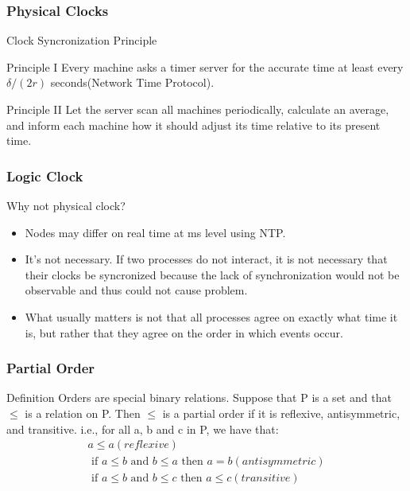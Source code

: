 \begin{frame}
    \frametitle{Physical Clocks}
    Clock Syncronization Principle
    \begin{block}{Principle I}
        Every machine asks a timer server for the accurate time at least every $\delta/(2r)$ seconds(Network Time Protocol).
    \end{block}
    \begin{block}{Principle II}
        Let the server scan all machines periodically, calculate an average, and inform each machine how it should adjust its time relative to its present time.
    \end{block}
\end{frame}

\begin{frame}
    \frametitle{Logic Clock}
    \begin{block}{Why not physical clock?}
        \begin{itemize}
            \item Nodes may differ on real time at ms level using NTP.
            \item It's not necessary. If two processes do not interact, it is not necessary that their clocks be syncronized because the lack of synchronization would not be observable and thus could not cause problem.
            \item What usually matters is not that all processes agree on exactly what time it is, but rather that they agree on the order in which events occur.
        \end{itemize}
    \end{block}
\end{frame}

\begin{frame}
    \frametitle{Partial Order}
    \begin{block}{Definition}
        Orders are special binary relations. Suppose that P is a set and that $\le$ is a relation on P. Then $\le$ is a \alert{partial order} if it is \alert{reflexive}, \alert{antisymmetric}, and \alert{transitive}. i.e., for all a, b and c in P, we have that: \\
        \begin{gather}
            a \le a (reflexive) \\
            \mbox{ if } a \le b \mbox{ and } b \le a \mbox{ then } a = b (antisymmetric) \\
            \mbox{ if } a \le b \mbox{ and } b \le c \mbox{ then } a \le c (transitive)
        \end{gather}
    \end{block}
\end{frame}

